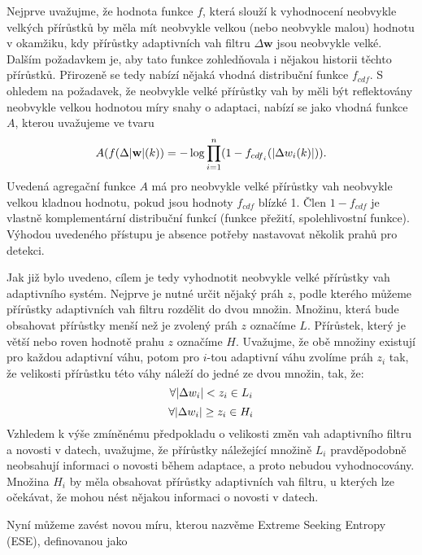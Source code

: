 \par
Nejprve uvažujme, že hodnota funkce $f$, která slouží k vyhodnocení neobvykle velkých přírůstků by měla mít neobvykle velkou (nebo neobvykle malou) hodnotu v okamžiku, kdy přírůstky adaptivních vah filtru $\Delta \textbf{w}$ jsou neobvykle velké. Dalším požadavkem je, aby tato funkce zohledňovala i nějakou historii těchto přírůstků. Přirozeně se tedy nabízí nějaká  vhodná distribuční funkce $f_{cdf}$. S ohledem na požadavek, že neobvykle velké přírůstky vah by měli být reflektovány neobvykle velkou hodnotou míry snahy o adaptaci, nabízí se jako vhodná funkce $A$, kterou uvažujeme ve tvaru
\begin{equation} \label{eq:ND_score}
A(f(\Delta \lvert\textbf{w}\rvert(k)) = -\log \prod_{i=1}^n(1 - f_{{cdf}_i}(\lvert \Delta  w_i(k)\rvert)).
\end{equation}
Uvedená agregační funkce $A$ má pro neobvykle velké přírůstky vah neobvykle velkou kladnou hodnotu, pokud jsou hodnoty $f_{cdf}$ blízké 1. Člen $1-f_{cdf}$ je vlastně komplementární distribuční funkcí (funkce přežití, spolehlivostní funkce). Výhodou uvedeného přístupu je absence potřeby nastavovat několik prahů pro detekci.
\par 
Jak již bylo uvedeno, cílem je tedy vyhodnotit neobvykle velké přírůstky vah adaptivního systém. Nejprve je nutné určit nějaký práh $z$, podle kterého můžeme přírůstky adaptivních vah filtru rozdělit do dvou množin. Množinu, která bude obsahovat přírůstky menší než je zvolený práh $z$ označíme $L$. Přírůstek, který je větší nebo roven hodnotě prahu $z$ označíme $H$.  Uvažujme, že obě množiny existují pro každou adaptivní váhu, potom pro $i$-tou adaptivní váhu zvolíme práh $z_i$ tak, že velikosti přírůstku této váhy náleží do jedné ze dvou množin, tak, že:
\begin{equation}
\forall \lvert\Delta w_i\rvert < z_i \in L_i
\end{equation}
\begin{equation}
\forall \lvert\Delta w_i\rvert \geq z_i \in H_i
\end{equation}
Vzhledem k výše zmíněnému předpokladu o velikosti změn vah adaptivního filtru a novosti v datech, uvažujme, že přírůstky náležející množině $L_i$ pravděpodobně neobsahují informaci o novosti během adaptace, a proto nebudou vyhodnocovány. Množina $H_i$ by měla obsahovat přírůstky adaptivních vah filtru, u kterých lze očekávat, že mohou nést nějakou informaci o novosti v datech.
\par
Nyní můžeme zavést novou míru, kterou nazvěme Extreme Seeking Entropy (ESE), definovanou jako

